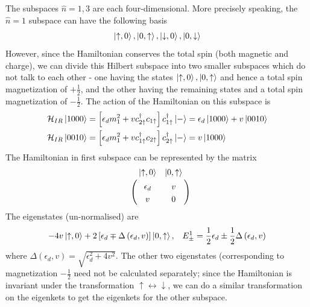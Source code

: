 \documentclass[twoside]{report}
\numberwithin{equation}{section}
\begin{document}
\\\\The subspaces \(\hat n = 1,3\) are each four-dimensional. More precisely speaking, the \(\hat n=1\) subspace can have the following basis
\begin{equation}\begin{aligned}
	\ket{\uparrow,0}, \ket{0,\uparrow}, \ket{\downarrow,0}, \ket{0,\downarrow}
\end{aligned}\end{equation}
However, since the Hamiltonian conserves the total spin (both magnetic and charge), we can divide this Hilbert subspace into two smaller subspaces which do not talk to each other - one having the states \(\ket{\uparrow,0}, \ket{0,\uparrow}\) and hence a total spin magnetization of \(+\frac{1}{2}\), and the other having the remaining states and a total spin magnetization of \(-\frac{1}{2}\). The action of the Hamiltonian on this subspace is
\begin{equation}\begin{aligned}
	\mathcal{H}_{IR} \ket{1000} &= \left[\epsilon_d m_1^2 + vc^\dagger_{2 \uparrow}c_{1 \uparrow}\right] c^\dagger_{1 \uparrow}\ket{-} = \epsilon_d\ket{1000} + v\ket{0010}\\
	\mathcal{H}_{IR} \ket{0010} &= \left[\epsilon_d m_1^2 + vc^\dagger_{1 \uparrow}c_{2 \uparrow}\right] c^\dagger_{2 \uparrow}\ket{-} = v\ket{1000}\\
\end{aligned}\end{equation}
The Hamiltonian in first subspace can be represented by the matrix
\begin{equation}\begin{aligned}
	\label{n1mat}
	\bordermatrix{~&\ket{\uparrow,0} & \ket{0,\uparrow} \\
		~&\epsilon_d & v \\
		~& v & 0 \\
	}
\end{aligned}\end{equation}
The eigenstates (un-normalised) are
\begin{equation}\begin{aligned}
\label{low}
	-4v\ket{\uparrow,0} +2 \left[ \epsilon_d \mp \Delta\left(\epsilon_d , v\right)\right] \ket{0, \uparrow}, && E^1_\pm = \frac{1}{2} \epsilon_d \pm \frac{1}{2}\Delta\left(\epsilon_d , v\right)
\end{aligned}\end{equation}
where \(\Delta\left(\epsilon_d , v\right)  = \sqrt{\epsilon_d^2 + 4 v^2}\). The other two eigenstates (corresponding to magnetization \(- \frac{1}{2}\) need not be calculated separately; since the Hamiltonian is invariant under the transformation \( \uparrow \leftrightarrow \downarrow\), we can do a similar transformation on the eigenkets to get the eigenkets for the other subspace.
\end{document}
